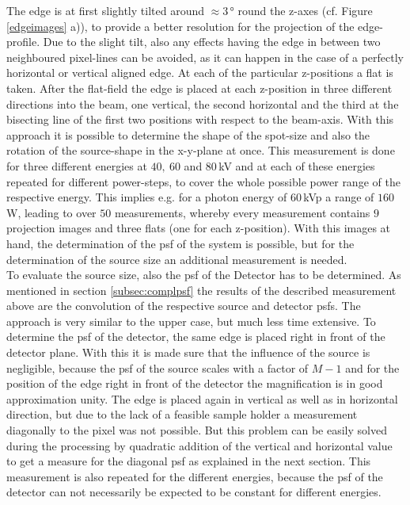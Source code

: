 \clearpage 
The edge is at first slightly tilted around $\approx 3\,$° round the z-axes (cf. Figure \ref{edgeimages} a)), to provide a better resolution for the projection of the edge-profile. Due to the slight tilt, also any effects having the edge in between two neighboured pixel-lines can be avoided, as it can happen in the case of a perfectly horizontal or vertical aligned edge.  At each of the particular z-positions a \gls{flat} is taken. After the flat-field the edge is placed at each z-position in three different directions into the beam, one vertical, the second horizontal and the third at the bisecting line of the first two positions with respect to the beam-axis. 
With this approach it is possible to determine the shape of the spot-size and also the rotation of the source-shape in the x-y-plane at once. 
This measurement is done for three different energies at $40,\ 60$ and $80\,$kV and at each of these energies repeated for different power-steps, to cover the whole possible power range of the respective energy. This implies e.g. for a photon energy of $60\,$kVp a range of $160\,$W, leading to over $50$ measurements, whereby every measurement contains $9$ projection images and three \glspl{flat} (one for each z-position).  With this images at hand, the determination of the \gls{psf} of the system is possible, but for the determination of the source size an additional measurement is needed.\\

To evaluate the source size, also the \gls{psf} of the Detector has to be determined. As mentioned in section \ref{subsec:complpsf} the results of the described measurement above are the convolution of the respective source and detector \glspl{psf}. The approach is very similar to the upper case, but much less time extensive. To determine the \gls{psf} of the detector, the same edge is placed right in front of the detector plane. With this it is made sure that the influence of the source is negligible, because the \gls{psf} of the source scales with a factor of $M-1$ and for the position of the edge right in front of the detector the magnification is in good approximation unity. The edge is placed again in vertical as well as in horizontal direction, but due to the lack of a feasible sample holder a measurement diagonally to the pixel was not possible. But this problem can be easily solved during the processing by quadratic addition of the vertical and horizontal value to get a measure for the diagonal \gls{psf} as explained in the next section. This measurement is also repeated for the different energies, because the \gls{psf} of the detector can not necessarily be expected to be constant for different energies. 
